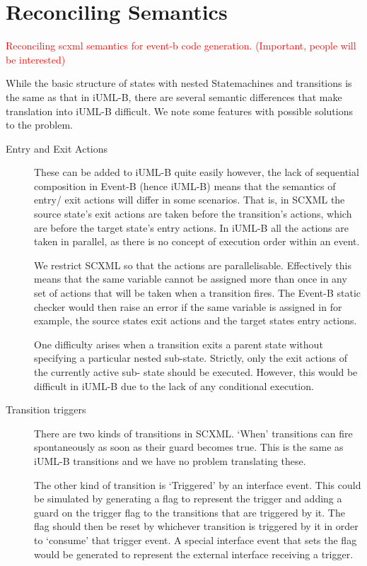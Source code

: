 \documentclass{easychair}
\begin{document}

\section{Reconciling Semantics}
\label{sect:recon}

\textcolor{red}{Reconciling scxml semantics for event-b code generation.  
(Important, people will be interested)}

While the basic structure of states with nested Statemachines and transitions is the same as that in iUML-B, there are several semantic differences that make translation into iUML-B difficult. We note some features with possible solutions to the problem.

\begin{description}
\item [Entry and Exit Actions] These can be added to iUML-B 
quite easily however, the lack of sequential composition in 
Event-B (hence iUML-B) means that the semantics of entry/
exit actions will differ in some scenarios. That is, in 
SCXML the source state’s exit actions are taken before the 
transition’s actions, which are before the target state’s 
entry actions. In iUML-B all the actions are taken in 
parallel, as there is no concept of execution order within 
an event. 

We restrict SCXML so that the actions are parallelisable. 
Effectively this means that the same variable cannot be 
assigned more than once in any set of actions that will be 
taken when a transition fires. The Event-B static checker 
would then raise an error if the same variable is assigned 
in for example, the source states exit actions and the 
target states entry actions. 

One difficulty arises when a transition exits a parent 
state without specifying a particular nested sub-state. 
Strictly, only the exit actions of the currently active sub-
state should be executed. However, this would be difficult 
in iUML-B due to the lack of any conditional execution.

\item [Transition triggers] There are two kinds of transitions in SCXML. 
‘When’ transitions can fire spontaneously as soon as their 
guard becomes true. This is the same as iUML-B transitions 
and we have no problem translating these.

The other kind of transition is ‘Triggered’ by an interface 
event. This could be simulated by generating a flag to 
represent the trigger and adding a guard on the trigger 
flag to the transitions that are triggered by it. The flag 
should then be reset by whichever transition is triggered 
by it in order to ‘consume’ that trigger event. A special 
interface event that sets the flag would be generated to 
represent the external interface receiving a trigger.


\end{description}
\end{document}
